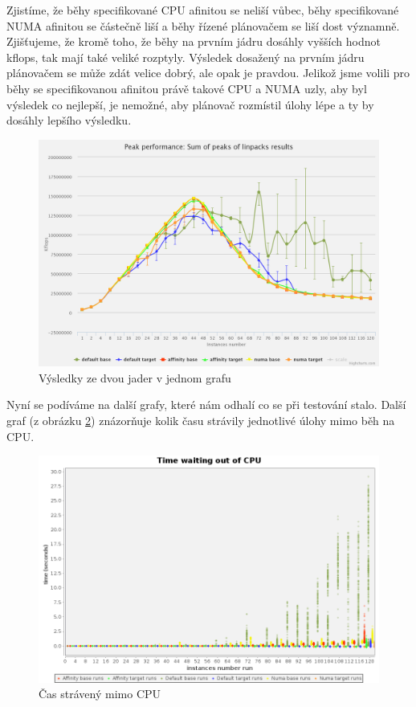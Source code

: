 \documentclass[
  master=true,
  font=sans,
  printversion=false,
  joinlists=true,
  figures=true,
  tables=true,
  sourcecodes=false,
  theorems=false,
  bibencoding=utf8,
  language=czech,
  encoding=utf8,
  field=ainfk,
  biblatex,
  glossaries,
  index
]{kidiplom}
\begin{document}
Zjistíme, že běhy specifikované CPU afinitou se neliší vůbec, běhy specifikované NUMA afinitou se částečně liší a běhy řízené plánovačem se liší dost významně. Zjišťujeme, že kromě toho, že běhy na prvním jádru dosáhly vyšších hodnot kflops, tak mají také veliké rozptyly. Výsledek dosažený na prvním jádru plánovačem se může zdát velice dobrý, ale opak je pravdou. Jelikož jsme volili pro běhy se specifikovanou afinitou právě takové CPU a NUMA uzly, aby byl výsledek co nejlepší, je nemožné, aby plánovač rozmístil úlohy lépe a ty by dosáhly lepšího výsledku. 

\begin{figure}[ht]
\center
\includegraphics[scale=0.165]{obrazky/LinpackSumChart.png}
\caption{Výsledky ze dvou jader v jednom grafu}
\label{both kernels linpack results}
\end{figure}

Nyní se podíváme na další grafy, které nám odhalí co se při testování stalo. Další graf (z obrázku \ref{timeWaitingOutOfCPU}) znázorňuje kolik času strávily jednotlivé úlohy mimo běh na CPU.

\begin{figure}[ht]
\center
\includegraphics[scale=0.32]{obrazky/timeWaitingOutOfCPU.png}
\caption{Čas strávený mimo CPU}
\label{timeWaitingOutOfCPU}
\end{figure}
\end{document}

